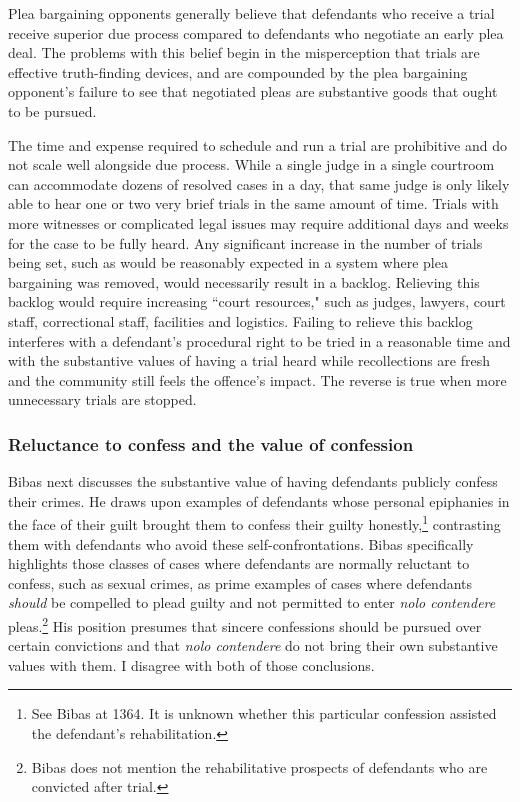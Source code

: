 Plea bargaining opponents generally believe that defendants who receive a trial receive superior due process compared to defendants who negotiate an early plea deal. The problems with this belief begin in the misperception that trials are effective truth-finding devices, and are compounded by the plea bargaining opponent's failure to see that negotiated pleas are substantive goods that ought to be pursued. 

The time and expense required to schedule and run a trial are prohibitive and do not scale well alongside due process. While a single judge in a single courtroom can accommodate dozens of resolved cases in a day, that same judge is only likely able to hear one or two very brief trials in the same amount of time. Trials with more witnesses or complicated legal issues may require additional days and weeks for the case to be fully heard. Any significant increase in the number of trials being set, such as would be reasonably expected in a system where plea bargaining was removed, would necessarily result in a backlog. Relieving this backlog would require increasing ``court resources," such as judges, lawyers, court staff, correctional staff, facilities and logistics. Failing to relieve this backlog interferes with a defendant's procedural right to be tried in a reasonable time and with the substantive values of having a trial heard while recollections are fresh and the community still feels the offence's impact. The reverse is true when more unnecessary trials are stopped. 

\subsubsection{Reluctance to confess and the value of confession}

Bibas next discusses the substantive value of having defendants publicly confess their crimes. He draws upon examples of defendants whose personal epiphanies in the face of their guilt brought them to confess their guilty honestly,\footnote{See Bibas at 1364. It is unknown whether this particular confession assisted the defendant's rehabilitation.} contrasting them with defendants who avoid these self-confrontations. Bibas specifically highlights those classes of cases where defendants are normally reluctant to confess, such as sexual crimes, as prime examples of cases where defendants \textit{should} be compelled to plead guilty and not permitted to enter \textit{nolo contendere} pleas.\footnote{Bibas does not mention the rehabilitative prospects of defendants who are convicted after trial.} His position presumes that sincere confessions should be pursued over certain convictions and that \textit{nolo contendere} do not bring their own substantive values with them. I disagree with both of those conclusions.

